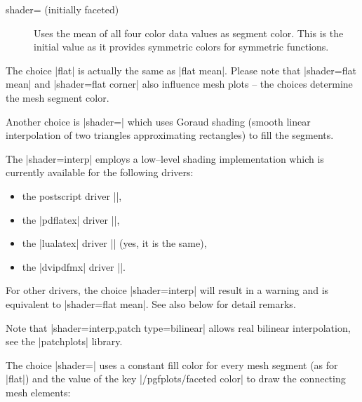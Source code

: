 {\begin{pgfplotskey}{shader= (initially faceted)}
\begin{description}
		\item[] Uses the mean of all four color data values as segment color. This is the initial value as it provides symmetric colors for symmetric functions.
	\end{description}
	The choice |flat| is actually the same as |flat mean|. Please note that |shader=flat mean| and |shader=flat corner| also influence mesh plots -- the choices determine the mesh segment color.

	Another choice is |shader=| which uses Goraud shading (smooth linear interpolation of two triangles approximating rectangles) to fill the segments. 

\pgfplotsexpensiveexample
\begin{codeexample}[]
\end{codeexample}

	The |shader=interp| employs a low--level shading implementation which is currently available for the following drivers:
	\begin{itemize}
		\item the postscript driver |\def\pgfsysdriver{pgfsys-dvips.def}|,
		\item the |pdflatex| driver |\def\pgfsysdriver{pgfsys-pdftex.def}|,
		\item the |lualatex| driver |\def\pgfsysdriver{pgfsys-pdftex.def}| (yes, it is the same),
		\item the |dvipdfmx| driver |\def\pgfsysdriver{pgfsys-dvipdfmx.def}|.
	\end{itemize}
	For other drivers, the choice |shader=interp| will result in a warning and is equivalent to |shader=flat mean|. See also below for detail remarks.
	
	Note that |shader=interp,patch type=bilinear| allows real bilinear interpolation, see the |patchplots| library.


	The choice |shader=| uses a constant fill color for every mesh segment (as for |flat|) and the value of the key |/pgfplots/faceted color| to draw the connecting mesh elements:
\pgfplotsexpensiveexample
\begin{codeexample}[]
\end{codeexample}


\end{pgfplotskey}}
